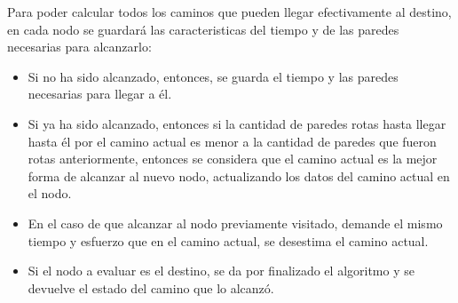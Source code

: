 Para poder calcular todos los caminos que pueden llegar efectivamente al destino, en cada nodo se guardará las caracteristicas del tiempo y de las paredes necesarias para alcanzarlo:
\begin{itemize}
\item Si no ha sido alcanzado, entonces, se guarda el tiempo y las paredes necesarias para llegar a \'el.
\item Si ya ha sido alcanzado, entonces si la cantidad de paredes rotas hasta llegar hasta él por el camino actual es menor a la cantidad de paredes que fueron rotas anteriormente, entonces se considera que el camino actual es la mejor forma de alcanzar al nuevo nodo, actualizando los datos del camino actual en el nodo.
\item En el caso de que alcanzar al nodo previamente visitado, demande el mismo tiempo y esfuerzo que en el camino actual, se desestima el camino actual.
\item Si el nodo a evaluar es el destino, se da por finalizado el algoritmo y se devuelve el estado del camino que lo alcanzó.
\end{itemize}